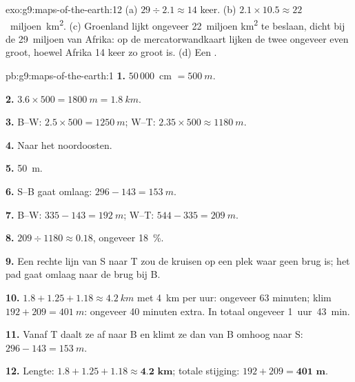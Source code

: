 \begin{solution}{exo:g9:maps-of-the-earth:12}
(a) $29 \div 2.1 \approx 14$ keer. (b) $2.1 \times 10.5 \approx
22$~miljoen~\unit{km^2}. (c) Groenland lijkt ongeveer 22~miljoen
\unit{km^2} te beslaan, dicht bij de 29~miljoen van Afrika: op de
mercatorwandkaart lijken de twee ongeveer even groot, hoewel Afrika
14 keer zo groot is. (d) Een .
\end{solution}

\begin{solution}{pb:g9:maps-of-the-earth:1}
\textbf{1.} $50\,000$~cm $= \qty{500}{m}$.

\textbf{2.} $3.6 \times 500 = \qty{1800}{m} = \qty{1.8}{km}$.

\textbf{3.} B--W: $2.5 \times 500 = \qty{1250}{m}$; W--T: $2.35 \times 500
\approx \qty{1180}{m}$.

\textbf{4.} Naar het noordoosten.

\textbf{5.} \qty{50}{m}.

\textbf{6.} S--B gaat omlaag: $296 - 143 = \qty{153}{m}$.

\textbf{7.} B--W: $335 - 143 = \qty{192}{m}$; W--T: $544 - 335 =
\qty{209}{m}$.

\textbf{8.} $209 \div 1180 \approx 0.18$, ongeveer \qty{18}{\%}.

\textbf{9.} Een rechte lijn van S naar T zou de  kruisen op een plek
waar geen brug is; het pad gaat omlaag naar de brug bij B.

\textbf{10.} $1.8 + 1.25 + 1.18 \approx \qty{4.2}{km}$ met \qty{4}{km} per
uur: ongeveer 63 minuten; klim $192 + 209 = \qty{401}{m}$: ongeveer
40 minuten extra. In totaal ongeveer 1~uur~43~min.

\textbf{11.} Vanaf T daalt ze af naar B en klimt ze dan van B omhoog naar
S: $296 -
143 = \qty{153}{m}$.

\textbf{12.} Lengte: $1.8 + 1.25 + 1.18 \approx \textbf{4.2 km}$; totale
stijging: $192 + 209 = \textbf{401 m}$.
\end{solution}
